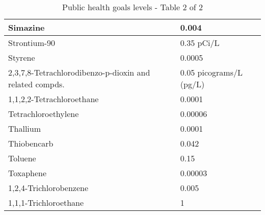 \begin{table}[]
\begin{tabular}{|m{9cm}|m{5cm}|}
Simazine                                                            & 0.004                                                   \\ \hline
Strontium-90                                                        & 0.35 pCi/L                                              \\ \hline
Styrene                                                             & 0.0005                                                  \\ \hline
2,3,7,8-Tetrachlorodibenzo-p-dioxin and related compds. & 0.05   picograms/L (pg/L)                               \\ \hline
1,1,2,2-Tetrachloroethane                                           & 0.0001                                                  \\ \hline
Tetrachloroethylene                                                 & 0.00006                                                 \\ \hline
Thallium                                                            & 0.0001                                                  \\ \hline
Thiobencarb                                                         & 0.042                                                   \\ \hline
Toluene                                                             & 0.15                                                    \\ \hline
Toxaphene                                                           & 0.00003                                                 \\ \hline
1,2,4-Trichlorobenzene                                              & 0.005                                                   \\ \hline
1,1,1-Trichloroethane                                               & 1                                                       \\ \hline
\end{tabular}
\caption{Public health goals levels - Table 2 of 2}
\label{table:PHG2}
\end{table}








